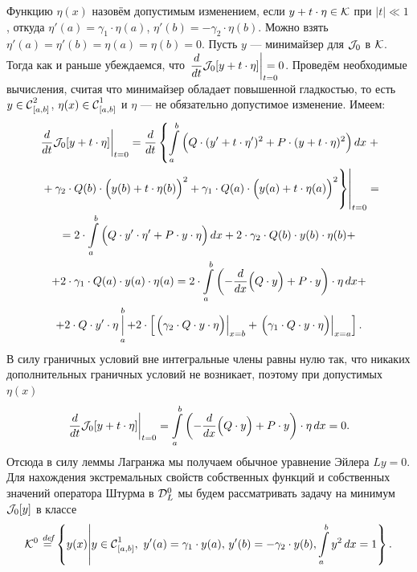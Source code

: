 Функцию $\eta(x)$ назовём допустимым изменением, если $y+t\cdot\eta\in\K$ при $|t|\ll1$, откуда $\eta'(a)={\gamma_1\cdot\eta(a)}$, $\eta'(b)=-\gamma_2\cdot\eta(b)$. Можно взять $\eta'(a)=\eta'(b)=\eta(a)=\eta(b)=0$. Пусть $y$ --- минимайзер для $\J_0$ в $\K$. Тогда как и раньше убеждаемся, что $\displaystyle\left.\der{}{t}\J_0[y+t\cdot\eta]\right|_{\lefteqn{\scriptstyle t=0}}=0$. Проведём необходимые вычисления, считая что минимайзер обладает повышенной гладкостью, то есть $y\in\Cfn[{[a,b]}]{2}$, ${\eta(x)\in\Cfn[{[a,b]}]{1}}$ и $\eta$ --- не обязательно допустимое изменение. Имеем:
\begin{multline*}
	\left.\der{}{t}\J_0[y+t\cdot\eta]\right|_{t=0}=\der{}{t}\left\{\int\limits_a^b\Big( Q\cdot(y'+t\cdot\eta')^2+P\cdot(y+t\cdot\eta)^2\Big)\,dx\right.+\\\left.\left.\vphantom{\int\limits_a^b}+\gamma_2\cdot Q(b)\cdot\Big(y(b)+t\cdot\eta(b)\Big)^2+\gamma_1\cdot Q(a)\cdot\Big(y(a)+t\cdot\eta(a)\Big)^2\right\}\right|_{t=0}=\\=2\cdot\int\limits_a^b\Big(Q\cdot y'\cdot\eta'+P\cdot y\cdot\eta\Big)\,dx+2\cdot\gamma_2\cdot Q(b)\cdot y(b)\cdot\eta(b)+\\
	+2\cdot\gamma_1\cdot Q(a)\cdot y(a)\cdot\eta(a)=2\cdot\int\limits_a^b\left(-\der{}{x}\Big(Q\cdot y\Big)+P\cdot y\right)\cdot\eta\,dx+\\+2\cdot Q\cdot y'\cdot\eta\mathop{\Big|}\limits_a^b
	+2\cdot\left[\left.\Big(\gamma_2\cdot Q\cdot y\cdot\eta\Big)\right|_{ x=b}+\left.\Big(\gamma_1\cdot Q\cdot y\cdot\eta\Big)\right|_{ x=a}\right].
\end{multline*} 
В силу граничных условий вне интегральные члены равны нулю так, что никаких дополнительных граничных условий не возникает, поэтому при допустимых $\eta(x)$
\begin{equation*}
	\left.\der{}{t}\J_0[y+t\cdot\eta]\right|_{t=0}=\int\limits_a^b\left(-\der{}{x}\Big(Q\cdot y\Big)+P\cdot y\right)\cdot\eta\,dx=0.
\end{equation*} 
Отсюда в силу леммы Лагранжа мы получаем обычное уравнение Эйлера $Ly=0$. Для нахождения экстремальных свойств собственных функций и собственных значений оператора Штурма в $\mc{D}_L^0$ мы будем рассматривать задачу на минимум $\J_0[y]$ в классе 
\begin{equation*}
	\K^0\!\eqdef\!\left\{y(x)\middle|y\in\Cfn[{[a,b]}]{1},\ y'(a)=\gamma_1\cdot y(a),\,y'(b)=-\gamma_2\cdot y(b),\int\limits_a^b y^2\,dx=1\right\}.
\end{equation*}
